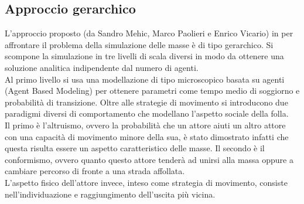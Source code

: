 \subsection{Approccio gerarchico}
 L'approccio proposto (da Sandro Mehic, Marco Paolieri e Enrico Vicario) in \cite{hierarchical-report} per affrontare il problema della simulazione delle masse è di tipo gerarchico. Si scompone la simulazione in tre livelli di scala diversi in modo da ottenere una soluzione analitica indipendente dal numero di agenti.\\
 Al primo livello si usa una modellazione di tipo microscopico basata su agenti (Agent Based Modeling) per ottenere parametri come tempo medio di soggiorno e probabilità di transizione. Oltre alle strategie di movimento si introducono due paradigmi diversi di comportamento che modellano l'aspetto sociale della folla.\\
 Il primo è l'altruismo, ovvero la probabilità che un attore aiuti un altro attore con una capacità di movimento minore della sua, è stato dimostrato infatti che questa risulta essere un aspetto caratteristico delle masse. Il secondo è il conformismo, ovvero quanto questo attore tenderà ad unirsi alla massa oppure a cambiare percorso di fronte a una strada affollata.\\
L'aspetto fisico dell'attore invece, inteso come strategia di movimento, consiste nell'individuazione e raggiungimento dell'uscita più vicina.
